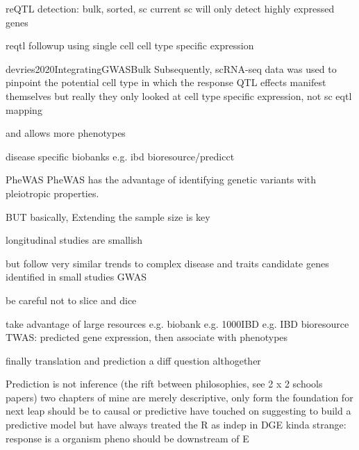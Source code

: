 \begin{outline}
        reQTL detection: bulk, sorted, sc
        current sc will only detect highly expressed genes

        reqtl followup using single cell cell type specific expression

        devries2020IntegratingGWASBulk
        Subsequently, scRNA-seq data was used to pinpoint the potential cell type in which the response QTL effects manifest themselves
            but really they only looked at cell type specific expression, not sc eqtl mapping

and allows
more phenotypes
        
        disease specific biobanks e.g. ibd bioresource/predicct


    PheWAS\autocite{verma2017CurrentScopeChallenges}
    PheWAS has the advantage of identifying genetic variants with pleiotropic properties.

BUT basically, Extending the sample size is key

    longitudinal studies are smallish

    but follow very similar trends to complex disease and traits
        candidate genes identified in small studies
        GWAS

    be careful not to slice and dice

    take advantage of large resources
    e.g. biobank
    e.g. 1000IBD
    e.g. IBD bioresource
        TWAS: predicted gene expression, then associate with phenotypes

finally translation and prediction
    a diff question althogether

    Prediction is not inference (the rift between philosophies, see 2 x 2 schools papers)
        two chapters of mine are merely descriptive, only form the foundation for next leap should be to causal or predictive
            have touched on suggesting to build a predictive model
        but have always treated the R as indep in DGE
        kinda strange: response is a organism pheno should be downstream of E


\end{outline}
